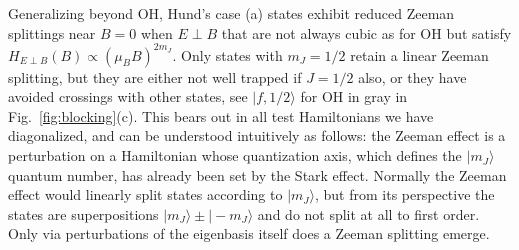 \documentclass[%
 reprint,
 amsmath,amssymb,
 aps,
prl,
]{revtex4-1}
\newcommand{\epb}{{$E\!\perp\!B$}}
\newcommand{\epbm}{{E\!\perp\!B}}
\begin{document}



Generalizing beyond OH, Hund's case (a) states exhibit reduced Zeeman splittings near $B\!=\!0$ when \epb{} that are not always cubic as for OH but satisfy $H_\epbm(B)\propto (\mu_BB)^{2m_J}$. Only states with $m_J=1/2$ retain a linear Zeeman splitting, but they are either not well trapped if $J=1/2$ also, or they have avoided crossings with other states, see $|f,1/2\rangle$ for OH in gray in Fig.~\ref{fig:blocking}(c). This bears out in all test Hamiltonians we have diagonalized, and can be understood intuitively as follows: the Zeeman effect is a perturbation on a Hamiltonian whose quantization axis, which defines the $|m_J\rangle$ quantum number, has already been set by the Stark effect. Normally the Zeeman effect would linearly split states according to $|m_J\rangle$, but from its perspective the states are superpositions $|m_J\rangle\pm|\!-\!m_J\rangle$ and do not split at all to first order. Only via perturbations of the eigenbasis itself does a Zeeman splitting emerge.
\end{document}
